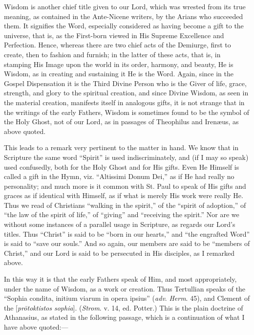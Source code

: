 Wisdom is another chief title given to our Lord, which was wrested
from its true meaning, as contained in the Ante-Nicene writers, by the
Arians who succeeded them. It signifies the Word, especially
considered as having become a gift to the universe, that is, as the
First-born viewed in His Supreme Excellence and Perfection. Hence,
whereas there are two chief acts of the Demiurge, first to create,
then to fashion and furnish; in the latter of these acts, that
is, in stamping His Image upon the world in its order, harmony, and
beauty, He is Wisdom, as in creating and sustaining it He is the Word.
Again, since in the Gospel Dispensation it is the Third Divine Person
who is the Giver of life, grace, strength, and glory to the spiritual
creation, and since Divine Wisdom, as seen in the material creation,
manifests itself in analogous gifts, it is not strange that in the
writings of the early Fathers, Wisdom is sometimes found to be the
symbol of the Holy Ghost, not of our Lord, as in passages of
Theophilus and Irenæus, as above quoted.

This leads to a remark very pertinent to the matter in hand. We
know that in Scripture the same word ``Spirit'' is used
indiscriminately, and (if I may so speak) used confusedly, both for
the Holy Ghost and for His gifts. Even He Himself is called a gift in
the Hymn, viz. ``Altissimi Donum Dei,'' as if He had really no
personality; and much more is it common with St. Paul to speak of His
gifts and graces as if identical with Himself, as if what is merely
His work were really He. Thus we read of Christians ``walking in
the spirit,'' of the ``spirit of adoption,'' of ``the
law of the spirit of life,'' of ``giving'' and
``receiving the spirit.'' Nor are we without some instances of
a parallel usage in Scripture, as regards our Lord's titles. Thus
``Christ'' is said to be ``born in our hearts,'' and
``the engrafted Word'' is said to ``save our souls.''
And so again, our members are said to be ``members of
Christ,'' and our Lord is said to be persecuted in His disciples,
as I remarked above.

In this way it is that the early Fathers speak of Him, and
most appropriately, under the name of Wisdom, as a work or creation.
Thus Tertullian speaks of the ``Sophia condita, initium viarum in
opera ipsius'' (\emph{adv}. \emph{Herm}. 45), and Clement of the [\emph{pr\={o}toktistos
sophia}]. (\emph{Strom}. v. 14, ed. Potter.) This is the plain
doctrine of Athanasius, as stated in the following passage, which is a
continuation of what I have above quoted:—

